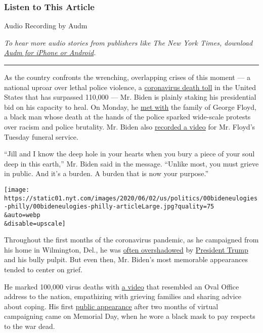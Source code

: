 \hypertarget{listen-to-this-article}{%
\subsubsection{Listen to This Article}\label{listen-to-this-article}}

Audio Recording by Audm

\emph{To hear more audio stories from publishers like The New York
Times, download}
\href{https://www.audm.com/?utm_source=nyt\&utm_medium=embed\&utm_campaign=biden_emissary_bereavement}{\emph{Audm
for iPhone or Android}}\emph{.}

\begin{center}\rule{0.5\linewidth}{\linethickness}\end{center}

As the country confronts the wrenching, overlapping crises of this
moment --- a national uproar over lethal police violence, a
\href{https://www.nytimes.com/interactive/2020/us/coronavirus-us-cases.html}{coronavirus
death toll} in the United States that has surpassed 110,000 --- Mr.
Biden is plainly staking his presidential bid on his capacity to heal.
On Monday, he
\href{https://www.nytimes.com/2020/06/07/us/politics/joe-biden-george-floyd-funeral.html}{met
with} the family of George Floyd, a black man whose death at the hands
of the police sparked wide-scale protests over racism and police
brutality. Mr. Biden also
\href{https://twitter.com/JoeBiden/status/1270427945375580160?s=20}{recorded
a video} for Mr. Floyd's Tuesday funeral service.

``Jill and I know the deep hole in your hearts when you bury a piece of
your soul deep in this earth,'' Mr. Biden said in the message. ``Unlike
most, you must grieve in public. And it's a burden. A burden that is now
your purpose.''

\texttt{[image: https://static01.nyt.com/images/2020/06/02/us/politics/00bideneulogies-philly/00bideneulogies-philly-articleLarge.jpg?quality=75\\\&auto=webp\\\&disable=upscale]}

Throughout the first months of the coronavirus pandemic, as he
campaigned from his home in Wilmington, Del., he was
\href{https://www.nytimes.com/2020/05/13/us/politics/joe-biden-donald-trump-2020.html}{often
overshadowed} by
\href{https://www.nytimes.com/interactive/2020/us/elections/donald-trump.html}{President
Trump} and his bully pulpit. But even then, Mr. Biden's most memorable
appearances tended to center on grief.

He marked 100,000 virus deaths with
\href{https://twitter.com/JoeBiden/status/1265757168504049664?s=20}{a
video} that resembled an Oval Office address to the nation, empathizing
with grieving families and sharing advice about coping. His first
\href{https://www.nytimes.com/2020/05/25/us/politics/joe-biden-memorial-day.html}{public
appearance} after two months of virtual campaigning came on Memorial
Day, when he wore a black mask to pay respects to the war dead.

